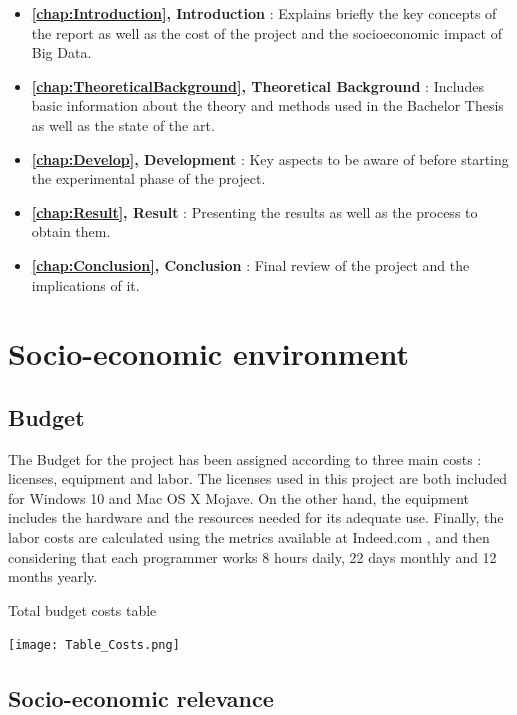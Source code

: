 \begin{itemize}
	\item \textbf{ \autoref{chap:Introduction}, Introduction} : Explains briefly the key concepts of the report as well as the cost of the project and the socioeconomic impact of Big Data.
	
	\item \textbf{ \autoref{chap:TheoreticalBackground}, Theoretical Background} : Includes basic information about the theory and methods used in the Bachelor Thesis as well as the state of the art.
	
	\item \textbf{ \autoref{chap:Develop}, Development} : Key aspects to be aware of before starting the experimental phase of the project.
	
	\item \textbf{ \autoref{chap:Result}, Result} : Presenting the results as well as the process to obtain them.
	
	\item \textbf{ \autoref{chap:Conclusion}, Conclusion} : Final review of the project and the implications of it.
	
\end{itemize}

\section{Socio-economic environment}
\subsection{Budget}

The Budget for the project has been assigned according to three main costs : licenses, equipment and labor. The licenses used in this project are both included for Windows 10 and Mac OS X Mojave. On the other hand, the equipment includes the hardware and the resources needed for its adequate use. Finally, the labor costs are calculated using the metrics available at Indeed.com \cite{ProgrammerSalaries}, and then considering that each programmer works 8 hours daily, 22 days monthly and 12 months yearly. \par
\begin{table}[H]
	\caption{Total budget costs table}
	\label{tbl:budget_table}
	\texttt{[image: Table\_Costs.png]}
\end{table}

\subsection{Socio-economic relevance}

